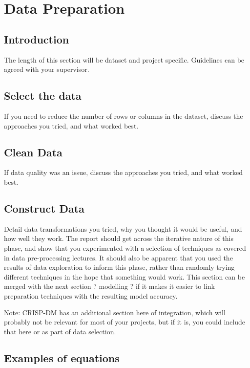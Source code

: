 \chapter{Data Preparation}
\label{chpt:prep}
\graphicspath{{Chapter3/Chapter3Figs/PNG/}{Chapter3/Chapter3Figs/PDF/}{Chapter3/Chapter3Figs/}}


\section{Introduction}
The length of this section will be dataset and project specific. Guidelines can be agreed with your supervisor.  

\section{Select the data}
If you need to reduce the number of rows or columns in the dataset, discuss the approaches you tried, and what worked best.

\section{Clean Data}
If data quality was an issue, discuss the approaches you tried, and what worked best.

\section{Construct Data}
Detail data transformations you tried, why you thought it would be useful, and how well they work.  The report should get across the iterative nature of this phase, and show that you experimented with a selection of techniques as covered in data pre-processing lectures. It should also be apparent that you used the results of data exploration to inform this phase, rather than randomly trying different techniques in the hope that something would work.  
This section can be merged with the next section ? modelling ? if it makes it easier to link preparation techniques with the resulting model accuracy.

Note: CRISP-DM has an additional section here of integration, which will probably not be relevant for most of your projects, but if it is, you could include that here or as part of data selection.

\section{Examples of equations}

